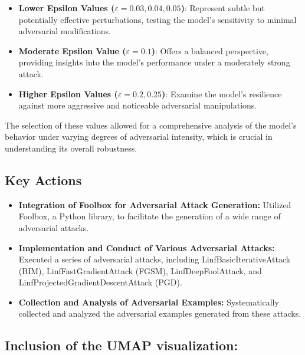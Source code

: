 \documentclass[10pt, conference, a4paper, final]{IEEEtran}
\begin{document}
\begin{itemize}
    \item \textbf{Lower Epsilon Values (\( \varepsilon = 0.03, 0.04, 0.05 \))}: Represent subtle but potentially effective perturbations, testing the model's sensitivity to minimal adversarial modifications.
    
    \item \textbf{Moderate Epsilon Value (\( \varepsilon = 0.1 \))}: Offers a balanced perspective, providing insights into the model's performance under a moderately strong attack.
    
    \item \textbf{Higher Epsilon Values (\( \varepsilon = 0.2, 0.25 \))}: Examine the model's resilience against more aggressive and noticeable adversarial manipulations.
\end{itemize}

The selection of these values allowed for a comprehensive analysis of the model's behavior under varying degrees of adversarial intensity, which is crucial in understanding its overall robustness.

\subsection{Key Actions}
\begin{itemize}
    \item \textbf{Integration of Foolbox for Adversarial Attack Generation:} Utilized Foolbox, a Python library, to facilitate the generation of a wide range of adversarial attacks.
    
    \item \textbf{Implementation and Conduct of Various Adversarial Attacks:} Executed a series of adversarial attacks, including LinfBasicIterativeAttack (BIM), LinfFastGradientAttack (FGSM), LinfDeepFoolAttack, and LinfProjectedGradientDescentAttack (PGD).
    
    \item \textbf{Collection and Analysis of Adversarial Examples:} Systematically collected and analyzed the adversarial examples generated from these attacks.
\end{itemize}\subsection{Inclusion of the UMAP visualization:}
\end{document}
